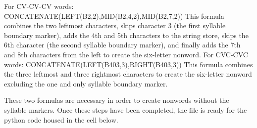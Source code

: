 For CV-CV-CV words: \=CONCATENATE(LEFT(B2,2),MID(B2,4,2),MID(B2,7,2))
This formula combines the two leftmost characters, skips character 3 (the first syllable boundary marker), adds the 4th and 5th characters to the string store, skips the 6th character (the second syllable boundary marker), and finally adds the 7th and 8th characters from the left to create the six-letter nonword.
For CVC-CVC words: \=CONCATENATE(LEFT(B403,3),RIGHT(B403,3))
This formula combines the three leftmost and three rightmost characters to create the six-letter nonword excluding the one and only syllable boundary marker.

These two formulas are necessary in order to create nonwords without the syllable markers. Once these steps have been completed, the file is ready for the python code housed in the cell below.

